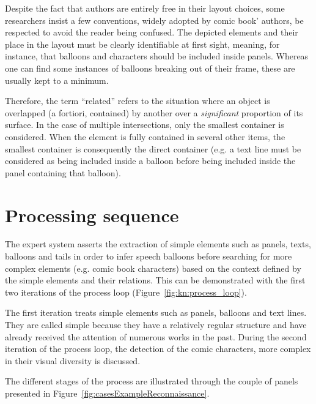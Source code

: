 Despite the fact that authors are entirely free in their layout choices, some researchers insist a few conventions, widely adopted by comic book' authors, be respected to avoid the reader being confused\cite{Laine2010,Duc1982}.
The depicted elements and their place in the layout must be clearly identifiable at first sight, meaning, for instance, that balloons and characters should be included inside panels.
Whereas one can find some instances of balloons breaking out of their frame, these are usually kept to a minimum.

Therefore, the term ``related'' refers to the situation where an object is overlapped (a fortiori, contained) by another over a \emph{significant} proportion of its surface.
In the case of multiple intersections, only the smallest container is considered.
When the element is fully contained in several other items, the smallest container is consequently the direct container (e.g. a text line must be considered as being included inside a balloon before being included inside the panel containing that balloon).

\section{Processing sequence} %
\label{sec:kn:framework_}

The expert system asserts the extraction of simple elements such as panels, texts, balloons and tails in order to infer speech balloons before searching for more complex elements (e.g. comic book characters) based on the context defined by the simple elements and their relations.
This can be demonstrated with the first two iterations of the process loop (Figure~\ref{fig:kn:process_loop}).

The first iteration treats simple elements such as panels, balloons and text lines.
They are called simple because they have a relatively regular structure and have already received the attention of numerous works in the past.
During the second iteration of the process loop, the detection of the comic characters, more complex in their visual diversity is discussed.

The different stages of the process are illustrated through the couple of panels presented in Figure~\ref{fig:casesExampleReconnaissance}.

